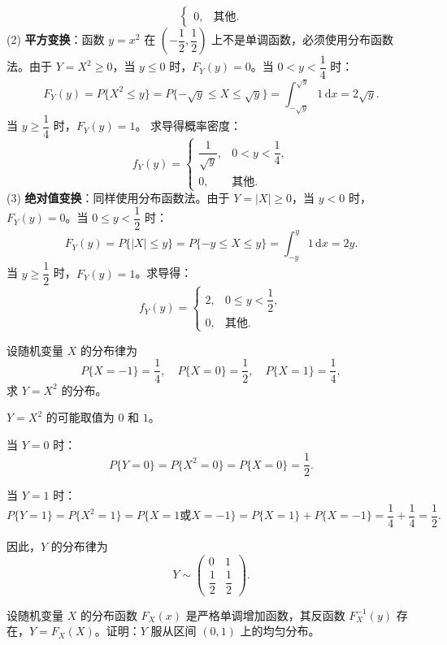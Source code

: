﻿\documentclass[lang=cn,11pt]{elegantbook}
\begin{document}
\begin{solution}
\[\begin{cases}
0, & \text{其他}.
\end{cases}
\]
(2) \textbf{平方变换}：函数 $y = x^2$ 在 $(-\dfrac{1}{2}, \dfrac{1}{2})$ 上不是单调函数，必须使用分布函数法。由于 $Y = X^2 \ge 0$，当 $y \le 0$ 时，$F_Y(y) = 0$。当 $0 < y < \dfrac{1}{4}$ 时：
\[
F_Y(y) = P\{X^2 \le y\} = P\{-\sqrt{y} \le X \le \sqrt{y}\} = \int_{-\sqrt{y}}^{\sqrt{y}} 1 \, \mathrm{d}x = 2\sqrt{y}.
\]
当 $y \ge \dfrac{1}{4}$ 时，$F_Y(y) = 1$。
求导得概率密度：
\[
f_Y(y) = \begin{cases}
\dfrac{1}{\sqrt{y}}, & 0 < y < \dfrac{1}{4}, \\[6pt]
0, & \text{其他}.
\end{cases}
\]
(3) \textbf{绝对值变换}：同样使用分布函数法。由于 $Y = |X| \ge 0$，当 $y < 0$ 时，$F_Y(y) = 0$。当 $0 \le y < \dfrac{1}{2}$ 时：
\[
F_Y(y) = P\{|X| \le y\} = P\{-y \le X \le y\} = \int_{-y}^{y} 1 \, \mathrm{d}x = 2y.
\]
当 $y \ge \dfrac{1}{2}$ 时，$F_Y(y) = 1$。求导得：
\[
f_Y(y) = \begin{cases}
2, & 0 \le y < \dfrac{1}{2}, \\[6pt]
0, & \text{其他}.
\end{cases}
\]
\end{solution}

\begin{exercise}[离散型随机变量的函数] \label{exer:2-19}
设随机变量 $X$ 的分布律为
\[
P\{X=-1\} = \frac{1}{4},\quad P\{X=0\} = \frac{1}{2},\quad P\{X=1\} = \frac{1}{4},
\]
求 $Y = X^2$ 的分布。
\end{exercise}

\begin{solution}
$Y = X^2$ 的可能取值为 $0$ 和 $1$。

当 $Y=0$ 时：
\[
P\{Y=0\} = P\{X^2=0\} = P\{X=0\} = \frac{1}{2}.
\]

当 $Y=1$ 时：
\[
P\{Y=1\} = P\{X^2=1\} = P\{X=1 \text{或} X=-1\} = P\{X=1\} + P\{X=-1\} = \frac{1}{4} + \frac{1}{4} = \frac{1}{2}.
\]

因此，$Y$ 的分布律为
\[
Y \sim \begin{pmatrix} 0 & 1 \\[4pt] \dfrac{1}{2} & \dfrac{1}{2} \end{pmatrix}.
\]
\end{solution}

\begin{exercise}[概率积分变换] \label{exer:2-20}
设随机变量 $X$ 的分布函数 $F_X(x)$ 是严格单调增加函数，其反函数 $F_X^{-1}(y)$ 存在，$Y = F_X(X)$。证明：$Y$ 服从区间 $(0,1)$ 上的均匀分布。
\end{exercise}
\end{document}
